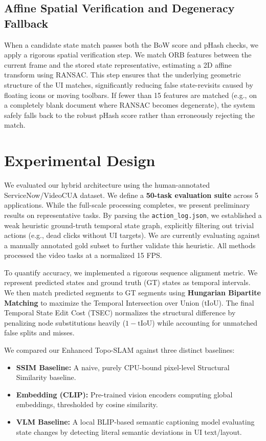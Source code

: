 \documentclass[journal]{IEEEtran}
\begin{document}
\subsection{Affine Spatial Verification and Degeneracy Fallback}
When a candidate state match passes both the BoW score and pHash checks, we apply a rigorous spatial verification step. We match ORB features between the current frame and the stored state representative, estimating a 2D affine transform using RANSAC. This step ensures that the underlying geometric structure of the UI matches, significantly reducing false state-revisits caused by floating icons or moving toolbars. If fewer than 15 features are matched (e.g., on a completely blank document where RANSAC becomes degenerate), the system safely falls back to the robust pHash score rather than erroneously rejecting the match.

\section{Experimental Design}

We evaluated our hybrid architecture using the human-annotated ServiceNow/VideoCUA dataset. We define a \textbf{50-task evaluation suite} across 5 applications. While the full-scale processing completes, we present preliminary results on representative tasks. By parsing the \texttt{action\_log.json}, we established a weak heuristic ground-truth temporal state graph, explicitly filtering out trivial actions (e.g., dead clicks without UI targets). We are currently evaluating against a manually annotated gold subset to further validate this heuristic. All methods processed the video tasks at a normalized 15 FPS.

To quantify accuracy, we implemented a rigorous sequence alignment metric. We represent predicted states and ground truth (GT) states as temporal intervals. We then match predicted segments to GT segments using \textbf{Hungarian Bipartite Matching} to maximize the Temporal Intersection over Union (tIoU). The final Temporal State Edit Cost (TSEC) normalizes the structural difference by penalizing node substitutions heavily ($1 - \text{tIoU}$) while accounting for unmatched false splits and misses.

We compared our Enhanced Topo-SLAM against three distinct baselines:
\begin{itemize}
    \item \textbf{SSIM Baseline:} A naive, purely CPU-bound pixel-level Structural Similarity baseline.
    \item \textbf{Embedding (CLIP):} Pre-trained vision encoders computing global embeddings, thresholded by cosine similarity.
    \item \textbf{VLM Baseline:} A local BLIP-based semantic captioning model evaluating state changes by detecting literal semantic deviations in UI text/layout.
\end{itemize}
\end{document}
